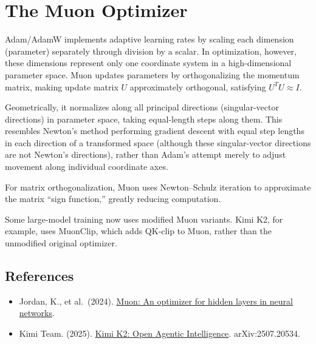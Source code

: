 \setcounter{section}{5}

\hypertarget{the-muon-optimizer}{%
\section{The Muon Optimizer}\label{the-muon-optimizer}}

Adam/AdamW implements adaptive learning rates by scaling each dimension (parameter) separately through division by a scalar. In optimization, however, these dimensions represent only one coordinate system in a high-dimensional parameter space. Muon updates parameters by orthogonalizing the momentum matrix, making update matrix \(U\) approximately orthogonal, satisfying \(U^{T}U\approx I\).

Geometrically, it normalizes along all principal directions (singular-vector directions) in parameter space, taking equal-length steps along them. This resembles Newton's method performing gradient descent with equal step lengths in each direction of a transformed space (although these singular-vector directions are not Newton's directions), rather than Adam's attempt merely to adjust movement along individual coordinate axes.

For matrix orthogonalization, Muon uses Newton--Schulz iteration to approximate the matrix ``sign function,'' greatly reducing computation.

Some large-model training now uses modified Muon variants. Kimi K2, for example, uses MuonClip, which adds QK-clip to Muon, rather than the unmodified original optimizer.

\FloatBarrier
{}
\hypertarget{references-30}{%
\subsection{References}\label{references-30}}

\vspace{0.25em}
\begin{itemize}
\tightlist
\item
  Jordan, K., et al.~(2024). \href{https://kellerjordan.github.io/posts/muon/}{Muon: An optimizer for hidden layers in neural networks}.
\item
  Kimi Team. (2025). \href{https://arxiv.org/abs/2507.20534}{Kimi K2: Open Agentic Intelligence}. arXiv:2507.20534.
\end{itemize}

\clearpage
